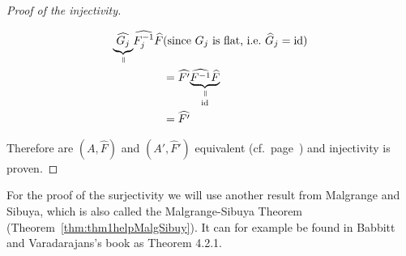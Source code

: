\begin{proof}[Proof of the injectivity]
\begin{itemize}
\begin{align*}
{          \underset{\text{\rotatebox[origin=c]{-90}{$=$}}}{%
            \underbrace{%
              \hat{G_j}
            }
          }
        }
        \hat{F_j^{-1}} \hat F
                      & \text{(since $G_j$ is flat, i.e.\ $\hat G_j=\id$)}
        \\            &= \hat{F'}
        \underset{\id}{%
          \underset{\text{\rotatebox[origin=c]{-90}{$=$}}}{%
            \underbrace{%
              \hat{F^{-1}} \hat F
            }
          }
        }
        \\            &= \hat{F'}
      \end{align*}
  \end{itemize}
  Therefore are $(A,\hat F)$ and $(A',\hat F')$ equivalent
  (cf.\ page~\pageref{page:ofDefnOfIsomOfMarkedPairs}) and injectivity is
  proven.
  \iffalse
    \begin{comment}
      \textbf{First look at injectivity:}
      Consider the two elements $(\cM,\nabla,\hat f)$ and
      $(\cM',\nabla',\hat f')$ of $\cH(\cM^{nf},\nabla^{nf})$ which map to same
      cohomology class
      \[
        \exp([(\cM,\nabla,\hat f)])=\lambda=\exp([(\cM',\nabla',\hat f')])
          \in H^1(S^1;\Lambda(A^0)) \,.
      \]
      Since we can use refined coverings, it is possible to find a finite
      covering $\cU=\{U_j;j\in J\}$ of $S^1$ such that $\lambda$ is the class
      of the cocycles $(f_lf_j^{-1})$ and $(f_l',f_j'^{-1})$, where
      $f_j$,$f_j'$ are defined on $U_j$.
      Since $[(f_lf_j^{-1})]=[(f_l'f_j'^{-1})]$ there exists a $0$-cochain
      $(g_j)$ of the sheaf $\Aut^{<0}(\tilde\cM^{nf})$ relative to the covering
      $(I_j)$, such that
      \[
        f_l'f_j'^{-1}=g_lf_lf_j^{-1}g_j^{-1} \text{ on } I_j\cap I_l.
      \]
      If we set $\sigma=f_j^{-1}g_{j}^{-1}f_j'$ on $I_{j}$, we get a horizontal
      section\TODO[~on~???], thus\TODO[why?] it satisfies
      $\sigma\circ\hat{f'}=\hat f$. Therefore are $(\cM,\nabla,\hat f)$ and
      $(\cM',\nabla',\hat{f'})$ isomorphic and injectivity is proven.
    \end{comment}
  \fi
\end{proof}

For the proof of the surjectivity we will use another result from Malgrange and
Sibuya, which is also called the Malgrange-Sibuya Theorem
(Theorem~\ref{thm:thm1helpMalgSibuy}). It can for example be found in Babbitt
and Varadarajans's book \cite[65ff]{babbitt1989local} as Theorem 4.2.1.


